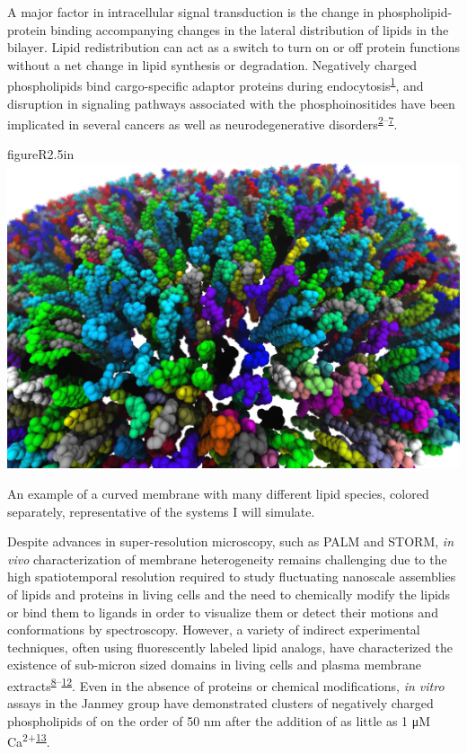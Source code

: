 \documentclass[11pt,notitlepage]{article}
\begin{document}
A major factor in intracellular signal transduction is the change in
phospholipid-protein binding accompanying changes in the lateral
distribution of lipids in the bilayer. Lipid redistribution can act as a
switch to turn on or off protein functions without a net change in lipid
synthesis or degradation. Negatively charged phospholipids bind
cargo-specific adaptor proteins during
endocytosis\textsuperscript{\protect\hyperlink{ref-73gnQLTS}{1}}, and
disruption in signaling pathways associated with the phosphoinositides
have been implicated in several cancers as well as neurodegenerative
disorders\textsuperscript{\protect\hyperlink{ref-8Xw2kuUO}{2}--\protect\hyperlink{ref-1DCzqvykg}{7}}.


\begin{wrapfloat}{figure}{R}{2.5in}
\centering
\includegraphics{content/images/membrane-vmd.png}
\caption{An example of a curved membrane with many different lipid
species, colored separately, representative of the systems I will
simulate.}
\label{fig:membrane-setup}
\end{wrapfloat}

Despite advances in super-resolution microscopy, such as PALM and STORM,
\emph{in vivo} characterization of membrane heterogeneity remains
challenging due to the high spatiotemporal resolution required to study
fluctuating nanoscale assemblies of lipids and proteins in living cells
and the need to chemically modify the lipids or bind them to ligands in
order to visualize them or detect their motions and conformations by
spectroscopy. However, a variety of indirect experimental techniques,
often using fluorescently labeled lipid analogs, have characterized the
existence of sub-micron sized domains in living cells and plasma
membrane
extracts\textsuperscript{\protect\hyperlink{ref-GGtK2c0N}{8}--\protect\hyperlink{ref-aiu6Tmil}{12}}.
Even in the absence of proteins or chemical modifications, \emph{in
vitro} assays in the Janmey group have demonstrated clusters of
negatively charged phospholipids of on the order of 50 nm after the
addition of as little as 1 μM
Ca\textsuperscript{2+}\textsuperscript{\protect\hyperlink{ref-LhOwGz4k}{13}}.
\end{document}
